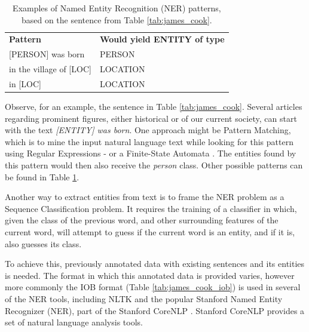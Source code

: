 \documentclass[11pt,a4paper,openright]{memoir}
\begin{document}
\begin{table}[!htbp]
  \centering
    \begin{tabular}{ll}
      \textbf{Pattern}          & \textbf{Would yield ENTITY of type} \\
      {[PERSON]} was born       & PERSON            \\
      in the village of {[LOC]} & LOCATION          \\
      in {[LOC]}                & LOCATION           
    \end{tabular}
  \caption[Patterns for NER.]{Examples of Named Entity Recognition (NER) patterns, based on the sentence from Table \ref{tab:james_cook}.}
  \label{tab:james_cook_patterns}
\end{table}

Observe, for an example, the sentence in Table \ref{tab:james_cook}. Several articles regarding prominent figures, either historical or of our current society, can start with the text \emph{[ENTITY] was born}. One approach might be Pattern Matching, which is to mine the input natural language text while looking for this pattern using Regular Expressions - or a Finite-State Automata \cite{Jurafsky:2000:SLP:555733}. The entities found by this pattern would then also receive the \emph{person} class. Other possible patterns can be found in Table \ref{tab:james_cook_patterns}.

Another way to extract entities from text is to frame the NER problem as a Sequence Classification problem. It requires the training of a classifier in which, given the class of the previous word, and other surrounding features of the current word, will attempt to guess if the current word is an entity, and if it is, also guesses its class.

To achieve this, previously annotated data with existing sentences and its entities is needed. The format in which this annotated data is provided varies, however more commonly the IOB format (Table \ref{tab:james_cook_iob}) is used in several of the NER tools, including NLTK \cite{BirdKleinLoper09} and the popular Stanford Named Entity Recognizer (NER), part of the Stanford CoreNLP \cite{manning-EtAl:2014:P14-5}. Stanford CoreNLP provides a set of natural language analysis tools.
\end{document}
